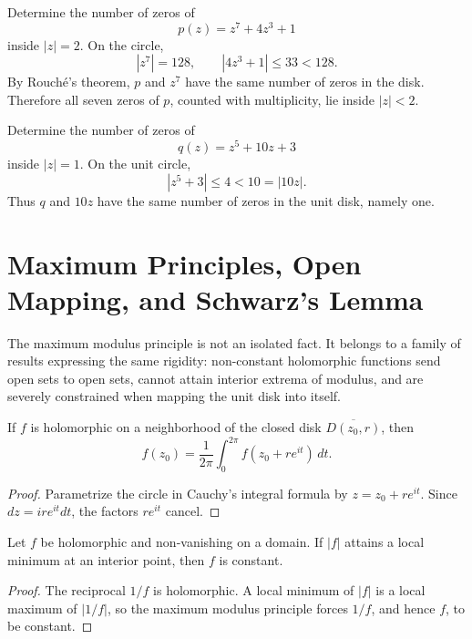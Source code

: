 \begin{example}
Determine the number of zeros of
\[
    p(z)=z^7+4z^3+1
\]
inside $|z|=2$. On the circle,
\[
    |z^7|=128,
    \qquad
    |4z^3+1|\leq33<128.
\]
By Rouché's theorem, $p$ and $z^7$ have the same number of zeros in the disk. Therefore all seven zeros of $p$, counted with multiplicity, lie inside $|z|<2$.
\end{example}

\begin{example}
Determine the number of zeros of
\[
    q(z)=z^5+10z+3
\]
inside $|z|=1$. On the unit circle,
\[
    |z^5+3|\leq4<10=|10z|.
\]
Thus $q$ and $10z$ have the same number of zeros in the unit disk, namely one.
\end{example}

\section{Maximum Principles, Open Mapping, and Schwarz's Lemma}

The maximum modulus principle is not an isolated fact. It belongs to a family of results expressing the same rigidity: non-constant holomorphic functions send open sets to open sets, cannot attain interior extrema of modulus, and are severely constrained when mapping the unit disk into itself.

\begin{theorem}
If $f$ is holomorphic on a neighborhood of the closed disk $\overline{D(z_0,r)}$, then
\[
    f(z_0)=\frac{1}{2\pi}\int_0^{2\pi}f(z_0+re^{it})\,dt.
\]
\end{theorem}

\begin{proof}
Parametrize the circle in Cauchy's integral formula by $z=z_0+re^{it}$. Since $dz=ire^{it}dt$, the factors $re^{it}$ cancel.
\end{proof}

\begin{theorem}
Let $f$ be holomorphic and non-vanishing on a domain. If $|f|$ attains a local minimum at an interior point, then $f$ is constant.
\end{theorem}

\begin{proof}
The reciprocal $1/f$ is holomorphic. A local minimum of $|f|$ is a local maximum of $|1/f|$, so the maximum modulus principle forces $1/f$, and hence $f$, to be constant.
\end{proof}


